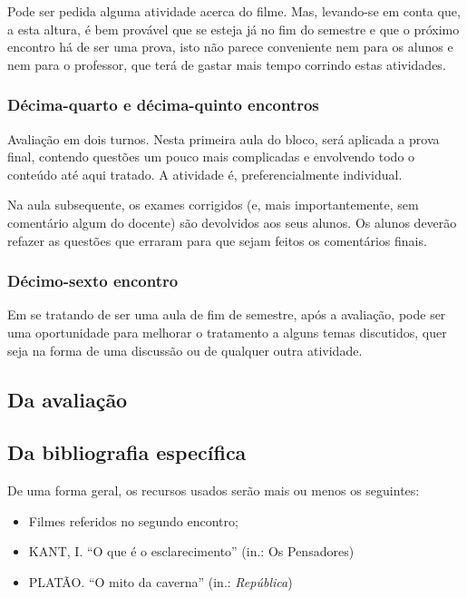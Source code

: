 \documentclass[12pt,a4paper]{article}
\begin{document}
	Pode ser pedida alguma atividade acerca do filme. Mas, 
	levando-se em conta que, a esta altura, é bem provável que se esteja 
	já no fim do semestre e que o próximo encontro há de ser uma prova, 
	isto não parece conveniente nem para os alunos e nem para o professor, 
	que terá de gastar mais tempo corrindo estas atividades. 
	
	\subsubsection{Décima-quarto e décima-quinto encontros}
	
	Avaliação em dois turnos. Nesta primeira aula do bloco, será aplicada 
	a prova final, contendo questões um pouco mais complicadas e 
	envolvendo todo o conteúdo até aqui tratado. A atividade é, 
	preferencialmente individual. 
	
	Na aula subsequente, os exames corrigidos (e, mais importantemente,  
	sem comentário algum do docente) são devolvidos aos seus alunos. Os 
	alunos deverão refazer as questões que erraram para que sejam 
    feitos os comentários finais. 
	
	\subsubsection{Décimo-sexto encontro}
	
	Em se tratando de ser uma aula de fim de semestre, após a avaliação, 
	pode ser uma oportunidade para melhorar o tratamento a alguns temas 
	discutidos, quer seja na forma de uma discussão ou de qualquer outra 
	atividade. 



	\newpage
	
	\subsection{Da avaliação}

	\subsection{Da bibliografia específica}
	
	De uma forma geral, os recursos usados serão mais ou menos os seguintes: 
	\begin{itemize}
		\item Filmes referidos no segundo encontro; 
		\item KANT, I. “O que é o esclarecimento” (in.: Os Pensadores)
		\item PLATÃO. “O mito da caverna” (in.: \textit{República})
	\end{itemize}
\end{document}
